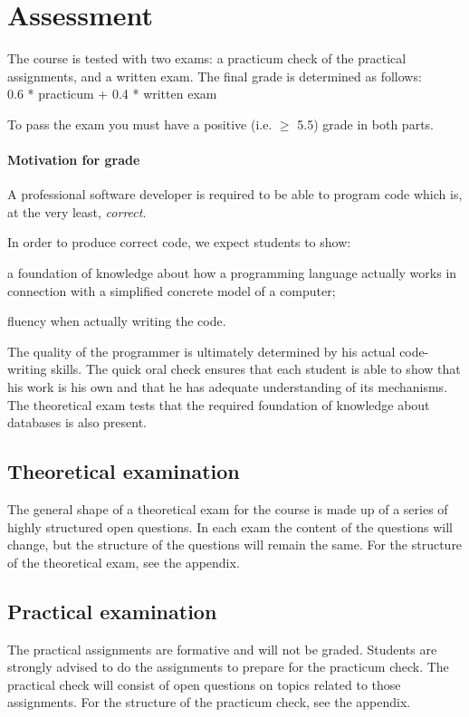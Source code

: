 \section{Assessment}
	The course is tested with two exams: a practicum check of the practical assignments, and a written exam. The final grade is determined as follows: \\

	0.6 * practicum + 0.4 * written exam

	To pass the exam you must have a positive (i.e. $\geq$ 5.5) grade in both parts.

	\paragraph*{Motivation for grade}
		A professional software developer is required to be able to program code which is, at the very least, \textit{correct}.

		In order to produce correct code, we expect students to show:
		\begin{inparaenum}
			\item a foundation of knowledge about how a programming language actually works in connection with a simplified concrete model of a computer;
			\item fluency when actually writing the code.
		\end{inparaenum}

		The quality of the programmer is ultimately determined by his actual code-writing skills. The quick oral check ensures that each student is able to show that his work is his own and that he has adequate understanding of its mechanisms. The theoretical exam tests that the required foundation of knowledge about databases is also present.


	\subsection{Theoretical examination}
		The general shape of a theoretical exam for the course is made up of a series of highly structured open questions. In each exam the content of the questions will change, but the structure of the questions will remain the same. For the structure of the theoretical exam, see the appendix.


	\subsection{Practical examination}
		The practical assignments are formative and will not be graded. Students are strongly advised to do the assignments to prepare for the practicum check. The practical check will consist of open questions on topics related to those assignments. For the structure of the practicum check, see the appendix. 

